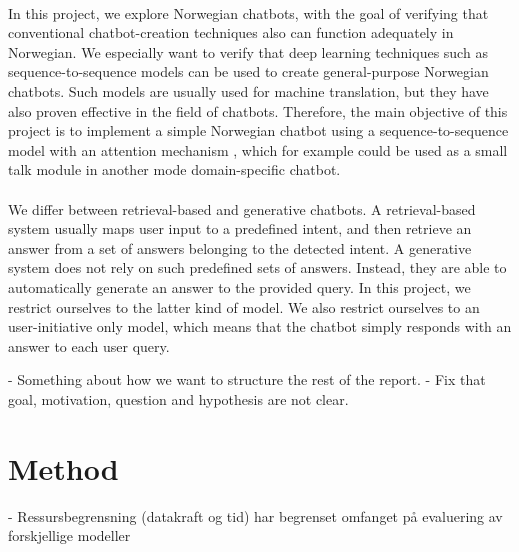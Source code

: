 \documentclass{article}
\begin{document}
\paragraph{}
In this project, we explore Norwegian chatbots, with the goal of verifying that
conventional chatbot-creation techniques also can function adequately in
Norwegian. We especially want to verify that deep learning techniques such as
sequence-to-sequence models \cite{Cho2014} can be used to create
general-purpose Norwegian chatbots. Such models are usually used for machine
translation, but they have also proven effective in the field of chatbots.
Therefore, the main objective of this project is to implement a simple Norwegian
chatbot using a sequence-to-sequence model with an attention mechanism
\cite{Bahdanau2015}, which for example could be used as a small talk module in
another mode domain-specific chatbot.

\paragraph{}
We differ between retrieval-based and generative chatbots. A retrieval-based
system usually maps user input to a predefined intent, and then retrieve an
answer from a set of answers belonging to the detected intent. A generative
system does not rely on such predefined sets of answers.  Instead, they are
able to automatically generate an answer to the provided query. In this
project, we restrict ourselves to the latter kind of model. We also restrict
ourselves to an user-initiative only model, which means that the chatbot simply
responds with an answer to each user query.

\if
- Something about how we want to structure the rest of the report.  
- Fix that goal, motivation, question and hypothesis are not clear.  
\fi

\section*{Method}
\if
 - Ressursbegrensning (datakraft og tid) har begrenset omfanget på evaluering
 av forskjellige modeller
\fi
\end{document}
